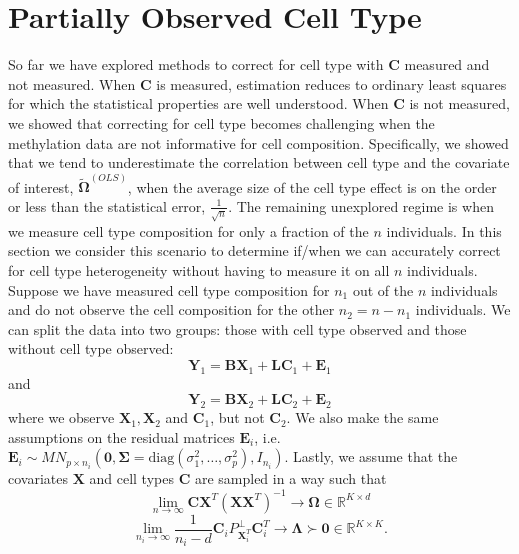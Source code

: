 \documentclass{article}
\begin{document}
\section{Partially Observed Cell Type}
\indent So far we have explored methods to correct for cell type with $\bm{C}$ measured and not measured. When $\bm{C}$ is measured, estimation reduces to ordinary least squares for which the statistical properties are well understood. When $\bm{C}$ is not measured, we showed that correcting for cell type becomes challenging when the methylation data are not informative for cell composition. Specifically, we showed that we tend to underestimate the correlation between cell type and the covariate of interest, $\tilde{\bm{\Omega}}^{(OLS)}$, when the average size of the cell type effect is on the order or less than the statistical error, $\frac{1}{\sqrt{n}}$. The remaining unexplored regime is when we measure cell type composition for only a fraction of the $n$ individuals. In this section we consider this scenario to determine if/when we can accurately correct for cell type heterogeneity without having to measure it on all $n$ individuals.\\
\indent Suppose we have measured cell type composition for $n_1$ out of the $n$ individuals and do not observe the cell composition for the other $n_2 = n - n_1$ individuals. We can split the data into two groups: those with cell type observed and those without cell type observed:
\begin{equation}
\bm{Y}_1 = \bm{B}\bm{X}_1 + \bm{L}\bm{C}_1 + \bm{E}_1
\end{equation}
and
\begin{equation}
\bm{Y}_2 = \bm{B}\bm{X}_2 + \bm{L}\bm{C}_2 + \bm{E}_2
\end{equation}
where we observe $\bm{X}_1, \bm{X}_2$ and $\bm{C}_1$, but not $\bm{C}_2$. We also make the same assumptions on the residual matrices $\bm{E}_i$, i.e. $\bm{E}_i \sim MN_{p \times n_i}\left( \bm{0}, \bm{\Sigma}=\text{diag}\left( \sigma_1^2, \ldots, \sigma_p^2 \right), I_{n_i} \right)$. Lastly, we assume that the covariates $\bm{X}$ and cell types $\bm{C}$ are sampled in a way such that
\begin{equation}
\lim_{n \to \infty} \bm{C}\bm{X}^T \left( \bm{X}\bm{X}^T \right)^{-1} \to \bm{\Omega} \in \mathbb{R}^{K \times d}
\end{equation}
\begin{equation}
\lim_{n_i \to \infty}\frac{1}{n_i-d} \bm{C}_i P_{\bm{X}_i^T}^{\perp}\bm{C}_i^T \to \bm{\Lambda} \succ \bm{0} \in \mathbb{R}^{K \times K}.
\end{equation}
\end{document}
